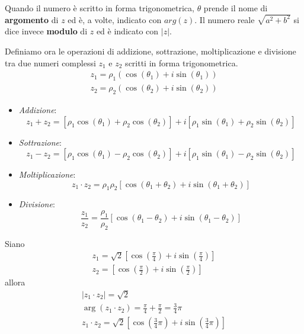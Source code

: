 Quando il numero \`e scritto in forma trigonometrica, $\theta$ prende il nome di \textbf{argomento}
di $z$ ed \`e, a volte, indicato con $arg(z)$. Il numero reale $\sqrt{a^2 + b^2}$ si dice invece
\textbf{modulo} di $z$ ed \`e indicato con $|z|$.

Definiamo ora le operazioni di addizione, sottrazione, moltiplicazione e divisione tra due numeri
complessi $z_1$ e $z_2$ scritti in forma trigonometrica.
\begin{gather*}
	z_1 = \rho_1 (\cos{(\theta_1)} + i \sin{(\theta_1)}) \\
	z_2 = \rho_2 (\cos{(\theta_2)} + i \sin{(\theta_2)})
\end{gather*}

\begin{itemize}
	\item \emph{Addizione}:
	      \begin{equation*}
		      z_1 + z_2 = [\rho_1 \cos{(\theta_1)} + \rho_2 \cos{(\theta_2)}] +
		      i [\rho_1 \sin{(\theta_1)} + \rho_2 \sin{(\theta_2)}]
	      \end{equation*}
	\item \emph{Sottrazione}:
	      \begin{equation*}
		      z_1 - z_2 = [\rho_1 \cos{(\theta_1)} - \rho_2 \cos{(\theta_2)}] +
		      i [\rho_1 \sin{(\theta_1)} - \rho_2 \sin{(\theta_2)}]
	      \end{equation*}
	\item \emph{Moltiplicazione}:
	      \begin{equation*}
		      z_1 \cdot z_2 = \rho_1 \rho_2
		      [\cos{(\theta_1  + \theta_2)} + i \sin{(\theta_1 + \theta_2)}]
	      \end{equation*}
	\item \emph{Divisione}:
	      \begin{equation*}
		      \frac{z_1}{z_2} = \frac{\rho_1}{\rho_2}
		      [\cos{(\theta_1 - \theta_2)} + i \sin{(\theta_1 - \theta_2)}]
	      \end{equation*}
\end{itemize}

\begin{example}
	Siano
	\begin{gather*}
		z_1 = \sqrt{2} \left[\cos{\left(\frac{\pi}{4}\right)} +
			i \sin{\left(\frac{\pi}{4}\right)}\right] \\
		z_2 = \left[\cos{\left(\frac{\pi}{2}\right)} +
			i \sin{\left(\frac{\pi}{2}\right)}\right]
	\end{gather*}
	allora
	\begin{gather*}
		|z_1 \cdot z_2| = \sqrt{2}                                             \\
		\arg{(z_1 \cdot z_2)} = \frac{\pi}{4} + \frac{\pi}{2} = \frac{3}{4} \pi      \\
		z_1 \cdot z_2 = \sqrt{2} \left[ \cos{\left( \frac{3}{4} \pi \right)}
			+ i \sin{\left( \frac{3}{4} \pi \right)} \right]
	\end{gather*}
\end{example}

